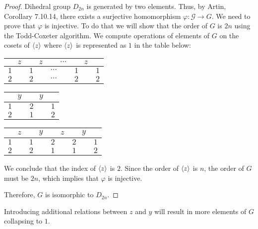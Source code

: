 \documentclass{article}
\theoremstyle{definition}
\DeclarePairedDelimiter\genby{\langle}{\rangle}
\begin{document}
\begin{proof}

Dihedral group $D_{2n}$ is generated by two elements.
Thus, by Artin, Corollary 7.10.14, there exists a surjective homomorphism $\varphi : \mathcal{G} \to G$.
We need to prove that $\varphi$ is injective.
To do that we will show that the order of $G$ is $2n$ using the Todd-Coxeter algorithm. We compute operations of elements of $G$ on the cosets of $\genby{z}$ where $\genby{z}$ is represented as $1$ in the table below:

\begin{center}
    \begin{tabular}{l l l l l} 
        \hline
        $\quad \> z$ & $\quad \> z$ & $\quad \> \cdots$ & $\quad \> z$ \\
        \hline
        $1$ & $1$ & $\cdots$ & $1$ & $1$ \\ 
        $2$ & $2$ & $\cdots$ & $2$ & $2$
        \\\hline
    \end{tabular}
\end{center}

\begin{center}
    \begin{tabular}{l l l} 
        \hline
        $\quad \> y$ & $\quad \> y$ \\
        \hline
        $1$ & $2$ & $1$ \\ 
        $2$ & $1$ & $2$
        \\\hline
    \end{tabular}
\end{center}

\begin{center}
    \begin{tabular}{l l l l l} 
        \hline
        $\quad \> z$ & $\quad \> y$ & $\quad \> z$ & $\quad \> y$ \\
        \hline
        $1$ & $1$ & $2$ & $2$ & $1$ \\ 
        $2$ & $2$ & $1$ & $1$ & $2$
        \\\hline
    \end{tabular}
\end{center}
We conclude that the index of $\genby{z}$ is $2$.
Since the order of $\genby{z}$ is $n$, the order of $G$ must be $2n$, which implies that $\varphi$ is injective.

Therefore, $G$ is isomorphic to $D_{2n}$.

\end{proof}

Introducing additional relations between $z$ and $y$ will result in more elements of $G$ collapsing to $1$.
\end{document}
